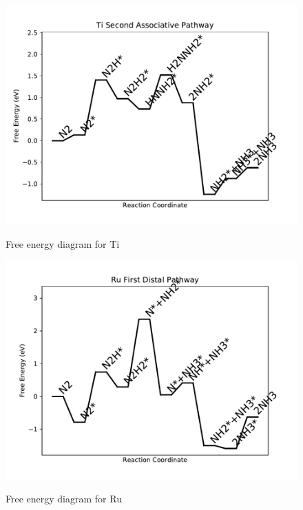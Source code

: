 \documentclass{article}
\begin{document}
\newpage
\begin{figure}
\includegraphics[width=1\linewidth]{data/plots/Ti_associative_2.pdf}
\label{fig:Ti_associative_2}
\caption{Free energy diagram for Ti}
\end{figure}

\begin{figure}
\includegraphics[width=1\linewidth]{data/plots/Ru_distal_1.pdf}
\label{fig:Ru_distal_1}
\caption{Free energy diagram for Ru}
\end{figure}
\end{document}
